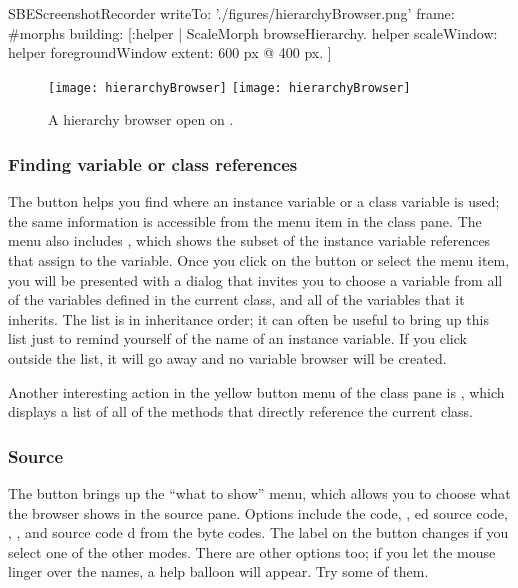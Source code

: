 \documentclass[a4paper,10pt,twoside]{book}
\begin{document}
\begin{ExecuteSmalltalkScript}
SBEScreenshotRecorder writeTo: './figures/hierarchyBrowser.png' frame: #morphs building: [:helper |
	ScaleMorph browseHierarchy.
	helper scaleWindow: helper foregroundWindow extent: 600 px @ 400 px.
]
\end{ExecuteSmalltalkScript}
\begin{figure}[btp]
	\begin{center}
	\ifluluelse
		{\texttt{[image: hierarchyBrowser]}}
		{\texttt{[image: hierarchyBrowser]}}
	\end{center}
	\caption{A hierarchy browser open on .}
	\label{fig:hierarchyBrowser}
\end{figure}

\subsubsection{Finding variable or class references}
\label{sec:variables}

The  button helps you find where an instance variable or a class variable is used; the same information is accessible from the  menu item  in the class pane.
The menu also includes , which shows the subset of the instance variable references that assign to the variable.
Once you click on the button or select the menu item, you will be presented with a dialog that invites you to choose a variable from all of the variables defined in the current class, and all of the variables that it inherits.
The list is in inheritance order; it can often be useful to bring up this list just to remind yourself of the name of an instance variable.
If you click outside the list, it will go away and no variable browser will be created.

Another interesting action in the yellow button menu of the class pane is , which displays a list of all of the methods that directly reference the current class.

\subsubsection{Source}
\label{sec:sources}

The  button brings up the ``what to show'' menu, which allows you to choose what the browser shows in the source pane.  Options include the  code, , ed source code, , , and source code d from the byte codes.
The label on the button changes if you select one of the other modes.
There are other options too; if you let the mouse linger over the names, a help balloon will appear.
Try some of them.
\end{document}
